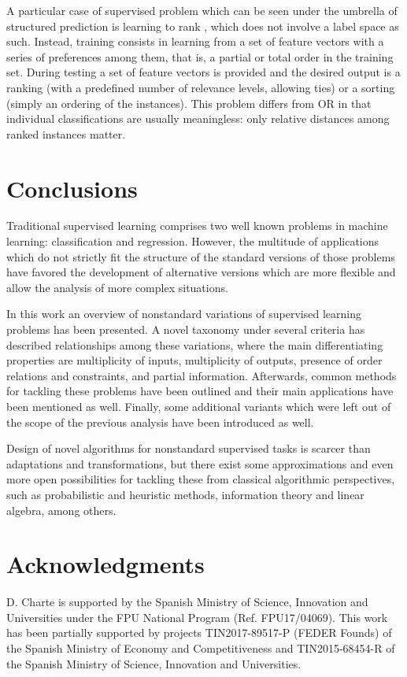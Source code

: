 A particular case of supervised problem which can be seen under the umbrella of structured prediction is learning to rank , which does not involve a label space as such. Instead, training consists in learning from a set of feature vectors with a series of preferences among them, that is, a partial or total order in the training set. During testing a set of feature vectors is provided and the desired output is a ranking (with a predefined number of relevance levels, allowing ties) or a sorting (simply an ordering of the instances). This problem differs from OR in that individual classifications are usually meaningless: only relative distances among ranked instances matter.

\section{Conclusions}
\label{p3sec:conclusions}

Traditional supervised learning comprises two well known problems in machine learning: classification and regression. However, the multitude of applications which do not strictly fit the structure of the standard versions of those problems have favored the development of alternative versions which are more flexible and allow the analysis of more complex situations. 

In this work an overview of nonstandard variations of supervised learning problems has been presented. A novel taxonomy under several criteria has described relationships among these variations, where the main differentiating properties are multiplicity of inputs, multiplicity of outputs, presence of order relations and constraints, and partial information. Afterwards, common methods for tackling these problems have been outlined and their main applications have been mentioned as well. Finally, some additional variants which were left out of the scope of the previous analysis have been introduced as well.

Design of novel algorithms for nonstandard supervised tasks is scarcer than adaptations and transformations, but there exist some approximations and even more open possibilities for tackling these from classical algorithmic perspectives, such as probabilistic and heuristic methods, information theory and linear algebra, among others. 

\section*{Acknowledgments}
  D. Charte is supported by the Spanish Ministry of Science, Innovation and Universities under the FPU National Program (Ref. FPU17/04069). This work has been partially supported by projects TIN2017-89517-P (FEDER Founds) of the Spanish Ministry of Economy and Competitiveness and TIN2015-68454-R of the Spanish Ministry of Science, Innovation and Universities.

